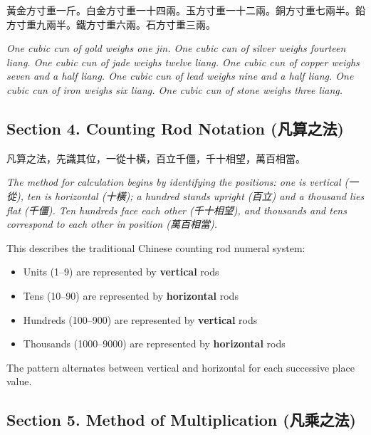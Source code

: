\documentclass[11pt,a4paper]{article}
\newcommand{\zh}[1]{{\CJKfamily{}#1}}
\begin{document}
\vspace{0.3cm}

\begin{problembox}[title=\zh{黃金方寸}]
\zh{黃金方寸重一斤。白金方寸重一十四兩。玉方寸重一十二兩。銅方寸重七兩半。鉛方寸重九兩半。鐵方寸重六兩。石方寸重三兩。}
\end{problembox}

\textit{One cubic cun of gold weighs one jin. One cubic cun of silver weighs fourteen liang. One cubic cun of jade weighs twelve liang. One cubic cun of copper weighs seven and a half liang. One cubic cun of lead weighs nine and a half liang. One cubic cun of iron weighs six liang. One cubic cun of stone weighs three liang.}

\subsection*{Section 4. Counting Rod Notation (\zh{凡算之法})}

\begin{problembox}[title=\zh{凡算之法}]
\zh{凡算之法，先識其位，一從十橫，百立千僵，千十相望，萬百相當。}
\end{problembox}

\textit{The method for calculation begins by identifying the positions: one is vertical (\zh{一從}), ten is horizontal (\zh{十橫}); a hundred stands upright (\zh{百立}) and a thousand lies flat (\zh{千僵}). Ten hundreds face each other (\zh{千十相望}), and thousands and tens correspond to each other in position (\zh{萬百相當}).}

This describes the traditional Chinese counting rod numeral system:
\begin{itemize}
  \item Units (1--9) are represented by \textbf{vertical} rods
  \item Tens (10--90) are represented by \textbf{horizontal} rods
  \item Hundreds (100--900) are represented by \textbf{vertical} rods
  \item Thousands (1000--9000) are represented by \textbf{horizontal} rods
\end{itemize}
The pattern alternates between vertical and horizontal for each successive place value.

\subsection*{Section 5. Method of Multiplication (\zh{凡乘之法})}
\end{document}
